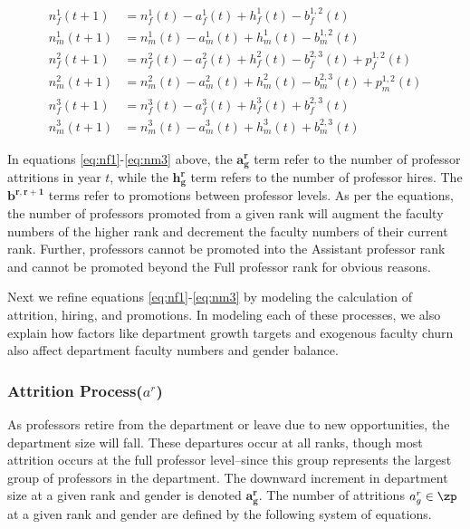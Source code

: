 \documentclass[12pt, a4paper, oneside, headinclude, footinclude,english]{article}
\begin{document}
\begin{align} 
  n^1_f(t+1) &= n^1_f(t) - a^1_f(t) + h^1_f(t) - b^{1,2}_f(t)  \label{eq:nf1} \\
  n^1_m(t+1) &= n^1_m(t) - a^1_m(t) + h^1_m(t) - b^{1,2}_m(t) \label{eq:nm1} \\
  n^2_f(t+1) &= n^2_f(t) - a^2_f(t) + h^2_f(t) - b^{2,3}_f(t) + p^{1,2}_f(t) \label{eq:nf2} \\ 
  n^2_m(t+1) &= n^2_m(t) - a^2_m(t) + h^2_m(t) - b^{2,3}_m(t) + p^{1,2}_m(t)  \label{eq:nm2} \\ 
  n^3_f(t+1) &= n^3_f(t) - a^3_f(t) + h^3_f(t) + b^{2,3}_f(t) \label{eq:nf3} \\
  n^3_m(t+1) &= n^3_m(t) - a^3_m(t) + h^3_m(t) + b^{2,3}_m(t) \label{eq:nm3}
\end{align}

In equations \ref{eq:nf1}-\ref{eq:nm3} above, the $\bm{a^r_g}$ term refer to the number of professor
attritions in year $t$, while the $\bm{h^r_g}$ term refers to the number of
professor hires. The $\bm{b^{r, r+1}}$ terms refer to promotions between
professor levels. As per the equations, the number of professors promoted from a
given rank will augment the faculty numbers of the higher rank and decrement the
faculty numbers of their current rank. Further, professors cannot be promoted
into the Assistant professor rank and cannot be promoted beyond the Full
professor rank for obvious reasons. 

Next we refine equations \ref{eq:nf1}-\ref{eq:nm3} by modeling the calculation of
attrition, hiring, and promotions. In modeling each of these processes, we also
explain how factors like department growth targets and exogenous faculty churn
also affect department faculty numbers and gender balance. 

\subsubsection{Attrition Process($a^r$)}
\label{sec:attrition}

As professors retire from the department or leave due to new opportunities, the
department size will fall. These departures occur at all ranks, though most
attrition occurs at the full professor level--since this group represents the
largest group of professors in the department. The downward increment in
department size at a given rank and gender is denoted $\bm{a^r_g}$. The number
of attritions $a^r_g \in \zp$ at a given rank and gender are defined by the
following system of equations.
\end{document}

